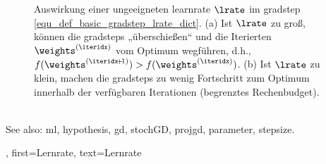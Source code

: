 {{{{{{\begin{figure}[hbtp]
\begin{center}
\begin{minipage}{0.45\columnwidth}
			\end{minipage}
		\end{center}
		\caption{Auswirkung einer ungeeigneten \gls{learnrate} $\lrate$ im \gls{gradstep} \eqref{equ_def_basic_gradstep_lrate_dict}. 
		         (a) Ist $\lrate$ zu groß, können die \glspl{gradstep} „überschießen“ und die Iterierten $\weights^{(\iteridx)}$ vom Optimum wegführen, d.h., $f(\weights^{(\iteridx\!+\!1)}) > f(\weights^{(\iteridx)})$. 
		         (b) Ist $\lrate$ zu klein, machen die \glspl{gradstep} zu wenig Fortschritt zum Optimum innerhalb der verfügbaren Iterationen (begrenztes Rechenbudget). 
		\label{fig_small_large_lrate_dict}}
		\end{figure}
		\\
		See also: \gls{ml}, \gls{hypothesis}, \gls{gd}, \gls{stochGD}, \gls{projgd}, \gls{parameter}, \gls{stepsize}.},
	first={Lernrate},
	text={Lernrate} 
}

}}}}
